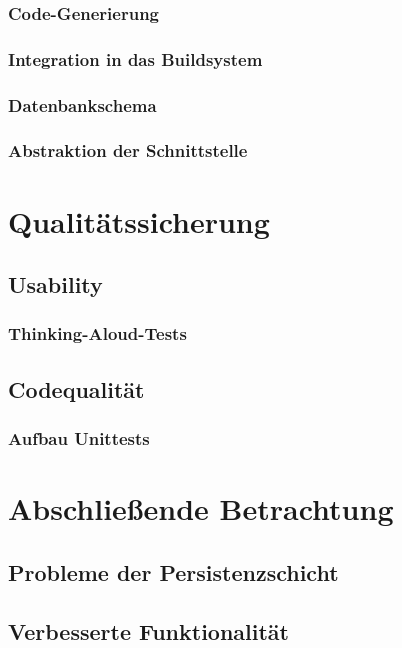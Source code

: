 \documentclass[a4paper,10pt]{article}
\begin{document}
\subsubsection{Code-Generierung}
\subsubsection{Integration in das Buildsystem}
\subsubsection{Datenbankschema}
\subsubsection{Abstraktion der Schnittstelle}

\section{Qualitätssicherung}
\subsection{Usability}
\subsubsection{Thinking-Aloud-Tests}
\subsection{Codequalität} 
\subsubsection{Aufbau Unittests}

\section{Abschließende Betrachtung}
\subsection{Probleme der Persistenzschicht}
\subsection{Verbesserte Funktionalität}
\end{document}
